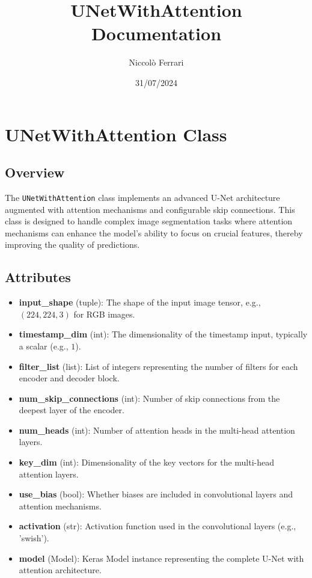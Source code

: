 \documentclass{article}
\title{UNetWithAttention Documentation}
\author{Niccolò Ferrari}
\date{31/07/2024}
\begin{document}
	
	\maketitle
	
	\section{UNetWithAttention Class}
	
	\subsection{Overview}
	
	The \texttt{UNetWithAttention} class implements an advanced U-Net architecture augmented with attention mechanisms and configurable skip connections. This class is designed to handle complex image segmentation tasks where attention mechanisms can enhance the model's ability to focus on crucial features, thereby improving the quality of predictions.
	
	\subsection{Attributes}
	
	\begin{itemize}
		\item \textbf{input\_shape} (tuple): The shape of the input image tensor, e.g., \((224, 224, 3)\) for RGB images.
		\item \textbf{timestamp\_dim} (int): The dimensionality of the timestamp input, typically a scalar (e.g., \(1\)).
		\item \textbf{filter\_list} (list): List of integers representing the number of filters for each encoder and decoder block.
		\item \textbf{num\_skip\_connections} (int): Number of skip connections from the deepest layer of the encoder.
		\item \textbf{num\_heads} (int): Number of attention heads in the multi-head attention layers.
		\item \textbf{key\_dim} (int): Dimensionality of the key vectors for the multi-head attention layers.
		\item \textbf{use\_bias} (bool): Whether biases are included in convolutional layers and attention mechanisms.
		\item \textbf{activation} (str): Activation function used in the convolutional layers (e.g., 'swish').
		\item \textbf{model} (Model): Keras Model instance representing the complete U-Net with attention architecture.
	\end{itemize}
	
\end{document}
